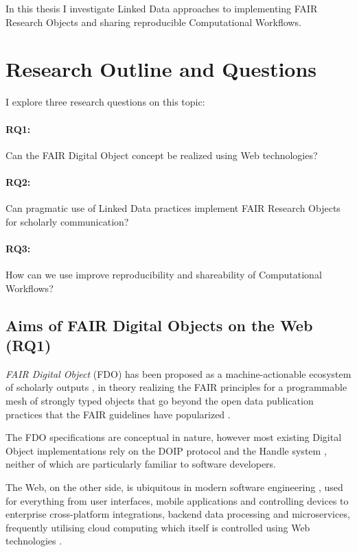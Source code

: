 In this thesis I investigate Linked Data approaches to implementing FAIR Research Objects and sharing reproducible Computational Workflows.

\section{Research Outline and Questions}

I explore three research questions on this topic:

\paragraph{RQ1:} Can the FAIR Digital Object concept be realized using Web technologies?

\paragraph{RQ2:} Can pragmatic use of Linked Data practices implement FAIR Research Objects for scholarly communication?

\paragraph{RQ3:} How can we use improve reproducibility and shareability of Computational Workflows?


\subsection{Aims of FAIR Digital Objects on the Web (RQ1)}

\emph{FAIR Digital Object} (FDO) has been proposed as a machine-actionable ecosystem of scholarly outputs \cite{Schultes 2019}, in theory realizing the FAIR principles \cite{Wilkinson 2016} for a programmable mesh of strongly typed objects that go beyond the open data publication practices that the FAIR guidelines have popularized \cite{Jacobsen 2020}.

The FDO specifications \cite{fdo-Overview} are conceptual in nature, however most existing Digital Object implementations \cite{Kahn 2006} rely on the DOIP protocol \cite{DigitalObjectInterface} and the Handle system \cite{rfc3650}, neither of which are particularly familiar to software developers.

The Web, on the other side, is ubiquitous in modern software engineering \cite{Taivalsaari 2021}, used for everything from user interfaces, mobile applications and controlling devices to enterprise cross-platform integrations, backend data processing and microservices, frequently utilising cloud computing which itself is controlled using Web technologies \cite{Marinescu 2022}.

